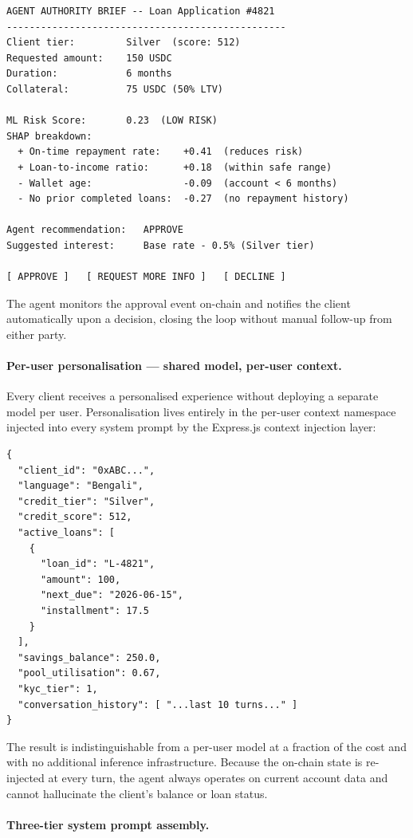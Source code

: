 \documentclass[12pt,a4paper]{report}
\begin{document}
\begin{verbatim}
AGENT AUTHORITY BRIEF -- Loan Application #4821
-------------------------------------------------
Client tier:         Silver  (score: 512)
Requested amount:    150 USDC
Duration:            6 months
Collateral:          75 USDC (50% LTV)

ML Risk Score:       0.23  (LOW RISK)
SHAP breakdown:
  + On-time repayment rate:    +0.41  (reduces risk)
  + Loan-to-income ratio:      +0.18  (within safe range)
  - Wallet age:                -0.09  (account < 6 months)
  - No prior completed loans:  -0.27  (no repayment history)

Agent recommendation:   APPROVE
Suggested interest:     Base rate - 0.5% (Silver tier)

[ APPROVE ]   [ REQUEST MORE INFO ]   [ DECLINE ]
\end{verbatim}

\noindent The agent monitors the approval event on-chain and notifies the client automatically upon a decision, closing the loop without manual follow-up from either party.

\paragraph{Per-user personalisation --- shared model, per-user context.}

Every client receives a personalised experience without deploying a separate model per user. Personalisation lives entirely in the per-user context namespace injected into every system prompt by the Express.js context injection layer:

\begin{verbatim}
{
  "client_id": "0xABC...",
  "language": "Bengali",
  "credit_tier": "Silver",
  "credit_score": 512,
  "active_loans": [
    {
      "loan_id": "L-4821",
      "amount": 100,
      "next_due": "2026-06-15",
      "installment": 17.5
    }
  ],
  "savings_balance": 250.0,
  "pool_utilisation": 0.67,
  "kyc_tier": 1,
  "conversation_history": [ "...last 10 turns..." ]
}
\end{verbatim}

\noindent The result is indistinguishable from a per-user model at a fraction of the cost and with no additional inference infrastructure. Because the on-chain state is re-injected at every turn, the agent always operates on current account data and cannot hallucinate the client's balance or loan status.

\paragraph{Three-tier system prompt assembly.}
\end{document}

